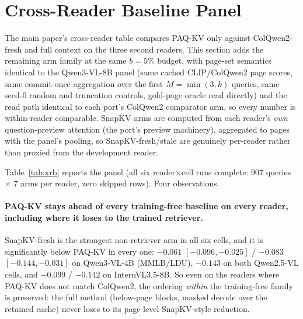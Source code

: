 \documentclass[letterpaper]{article} %
\newcommand{\paqc}{\textsc{PAQ-KV}}
\begin{document}
\section{Cross-Reader Baseline Panel}\label{sec:xrb}

The main paper's cross-reader table compares \paqc{} only against ColQwen2-fresh and full context on the three second readers. This section adds the remaining arm family at the same $b=5\%$ budget, with page-set semantics identical to the Qwen3-VL-8B panel (same cached CLIP/ColQwen2 page scores, same commit-once aggregation over the first $M{=}\min(3,k)$ queries, same seed-0 random and truncation controls, gold-page oracle read directly) and the read path identical to each port's ColQwen2 comparator arm, so every number is within-reader comparable. SnapKV arms are computed from each reader's \emph{own} question-preview attention (the port's preview machinery), aggregated to pages with the panel's pooling, so SnapKV-fresh/stale are genuinely per-reader rather than proxied from the development reader.

\begin{table}[t]
\centering\small
\setlength{\tabcolsep}{3pt}

\caption{Baseline arm family on the three second readers at the 80-document development pins (LDU = LongDocURL, MMLB = MMLongBench-Doc), $b=5\%$. The \paqc{}/ColQwen2-fresh/full-context rows are the cached values from the cross-reader ports (identical to the main paper's Table); the remaining arms are new runs with matched page-set semantics. Development-grade.}
\label{tab:xrb}
\end{table}

Table~\ref{tab:xrb} reports the panel (all six reader$\times$cell runs complete: 907 queries $\times$ 7 arms per reader, zero skipped rows). Four observations.

\paragraph{\paqc{} stays ahead of every training-free baseline on every reader, including where it loses to the trained retriever.} SnapKV-fresh is the strongest non-retriever arm in all six cells, and it is significantly below \paqc{} in every one: $-0.061$ $[-0.096,-0.025]$ / $-0.083$ $[-0.144,-0.031]$ on Qwen3-VL-4B (MMLB/LDU), $-0.143$ on both Qwen2.5-VL cells, and $-0.099$ / $-0.142$ on InternVL3.5-8B. So even on the readers where \paqc{} does not match ColQwen2, the ordering \emph{within} the training-free family is preserved: the full method (below-page blocks, masked decode over the retained cache) never loses to its page-level SnapKV-style reduction.
\end{document}
